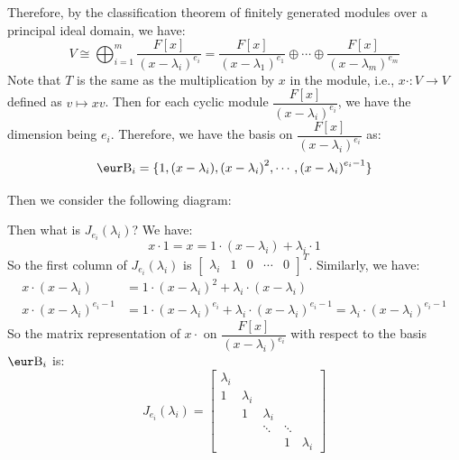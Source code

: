 Therefore, by the classification theorem of finitely generated modules over a principal ideal domain, we have:
\[
  V \cong \bigoplus_{i = 1}^m \frac{F[x]}{{(x - \lambda_i)}^{e_i}} = \frac{F[x]}{{(x - \lambda_1)}^{e_1}} \oplus \cdots \oplus \frac{F[x]}{{(x - \lambda_m)}^{e_m}}
\]
Note that $T$ is the same as the multiplication by $x$ in the module, i.e., $x\cdot : V \to V$ defined as $v \mapsto x v$. Then for each cyclic module $\dfrac{F[x]}{{(x - \lambda_i)}^{e_i}}$, we have the dimension being $e_i$. Therefore, we have the basis on $\dfrac{F[x]}{{(x - \lambda_i)}^{e_i}}$ as:
\[
  \B_i = \{ 1, (x - \lambda_i), {(x - \lambda_i)}^2, \cdots, {(x - \lambda_i)}^{e_i - 1} \}
\]

Then we consider the following diagram:
\begin{center}
\end{center}
Then what is $J_{e_i} (\lambda_i)$? We have:
\[
  x \cdot 1 = x = 1 \cdot (x - \lambda_i) + \lambda_i \cdot 1
\]
So the first column of $J_{e_i} (\lambda_i)$ is $\begin{bmatrix} \lambda_i & 1 & 0 & \cdots & 0 \end{bmatrix}^T$. Similarly, we have:
\begin{align*}
  x \cdot (x - \lambda_i)             & = 1 \cdot {(x - \lambda_i)}^2 + \lambda_i \cdot (x - \lambda_i)                                                               \\
  x \cdot {(x - \lambda_i)}^{e_i - 1} & = 1 \cdot {(x - \lambda_i)}^{e_i} + \lambda_i \cdot {(x - \lambda_i)}^{e_i - 1} = \lambda_i \cdot {(x - \lambda_i)}^{e_i - 1}
\end{align*}
So the matrix representation of $x \cdot$ on $\dfrac{F[x]}{{(x - \lambda_i)}^{e_i}}$ with respect to the basis $\B_i$ is:
\[
  J_{e_i} (\lambda_i) = \begin{bmatrix}
    \lambda_i &           &           &        &           \\
    1         & \lambda_i &           &        &           \\
              & 1         & \lambda_i &        &           \\
              &           & \ddots    & \ddots &           \\
              &           &           & 1      & \lambda_i
  \end{bmatrix}
\]

